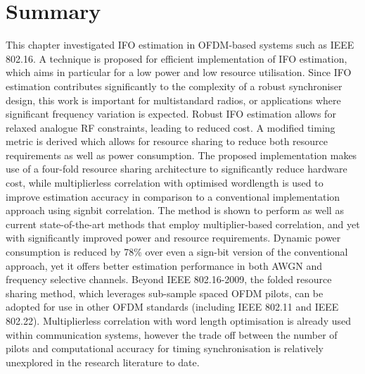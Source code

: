 \section{Summary}

This chapter investigated IFO estimation in OFDM-based systems such as IEEE 802.16. A technique is proposed for efficient implementation of IFO estimation, which aims in particular for a low power and low resource utilisation.
Since IFO estimation contributes significantly to the complexity of a robust synchroniser design, this work is important for multistandard radios, or applications where significant frequency variation is expected. Robust IFO estimation allows for relaxed analogue RF constraints, leading to reduced cost. A modified timing metric is derived which allows for resource sharing to reduce both resource requirements as well as power consumption. The proposed implementation makes use of a four-fold resource sharing architecture to significantly reduce hardware cost, while multiplierless correlation with optimised wordlength is used to improve estimation accuracy in comparison to a conventional implementation approach using signbit correlation.
The method is shown to perform as well as current state-of-the-art methods that employ multiplier-based correlation, and yet with significantly improved power and resource requirements. Dynamic power consumption is reduced by 78\% over even a sign-bit version of the conventional approach, yet it offers better estimation performance in both AWGN and frequency selective channels.
Beyond IEEE 802.16-2009, the folded resource sharing method, which leverages sub-sample spaced OFDM pilots, can be adopted for use in other OFDM standards (including IEEE 802.11 and IEEE 802.22). Multiplierless correlation with word length optimisation is already used within communication systems, however the trade off between the number of pilots and computational accuracy for timing synchronisation is relatively unexplored in the research literature to date.
